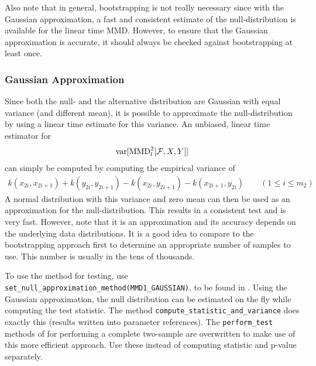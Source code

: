 Also note that in general, bootstrapping is not really necessary since with the Gaussian approximation, a fast and consistent estimate of the null-distribution is available for the linear time MMD. However, to ensure that the Gaussian approximation is accurate, it should always be checked against bootstrapping at least once.

\subsubsection{Gaussian Approximation}
Since both the null- and the alternative distribution are Gaussian with equal variance (and different mean), it is possible to approximate the null-distribution by using a linear time estimate for this variance. An unbiased, linear time estimator for
\begin{align*}
\operatorname{var}[\operatorname{MMD}_l^2[\mathcal{F},X,Y]]
\end{align*}
can simply be computed by computing the empirical variance of
\begin{align*}
k(x_{2i},x_{2i+1})+k(y_{2i},y_{2i+1})-k(x_{2i},y_{2i+1})-k(x_{2i+1},y_{2i}) \qquad (1\leq i\leq m_2)
\end{align*}
A normal distribution with this variance and zero mean can then be used as an approximation for the null-distribution. This results in a consistent test and is very fast. However, note that it is an approximation and its accuracy depends on the underlying data distributions. It is a good idea to compare to the bootstrapping approach first to determine an appropriate number of samples to use. This number is usually in the tens of thousands.

To use the method for testing, use \texttt{set\_null\_approximation\_method(MMD1\_GAUSSIAN)}, to be found in . Using the Gaussian approximation, the null distribution can be estimated on the fly while computing the test statistic. The method \texttt{compute\_statistic\_and\_variance} does exactly this (results written into parameter references). The \texttt{perform\_test} methods of  for performing a complete two-sample are overwritten to make use of this more efficient approach. Use these instead of computing statistic and p-value separately.

